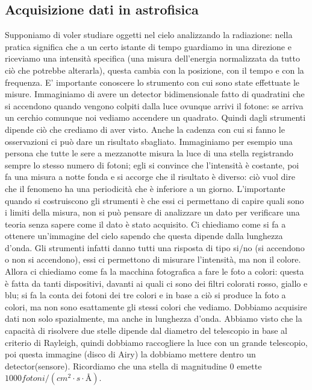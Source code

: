 \documentclass[a4paper,11pt]{article}
\begin{document}
\vspace{3mm}
\subsection{Acquisizione dati in astrofisica}
 Supponiamo di voler studiare oggetti nel cielo analizzando la radiazione: nella pratica significa che a un certo istante di tempo guardiamo in una direzione e riceviamo una intensità specifica (una misura dell’energia normalizzata da tutto ciò che potrebbe alterarla), questa cambia con la posizione, con il tempo e con la frequenza. 
\newline
E’ importante conoscere lo strumento con cui sono state effettuate le misure. Immaginiamo di avere un detector bidimensionale fatto di quadratini che si accendono quando vengono colpiti dalla luce ovunque arrivi il fotone: se arriva un cerchio comunque noi vediamo accendere un quadrato. Quindi dagli strumenti dipende ciò che crediamo di aver visto.
\newline
Anche la cadenza con cui si fanno le osservazioni ci può dare un risultato sbagliato. Immaginiamo per esempio una persona che tutte le sere a mezzanotte misura la luce di una stella registrando sempre lo stesso numero di fotoni; egli si convince che l’intensità è costante, poi fa una misura a notte fonda e si accorge che il risultato è diverso: ciò vuol dire che il fenomeno ha una periodicità che è inferiore a un giorno.
\newline
 L’importante quando si costruiscono gli strumenti è che essi ci permettano di capire quali sono i limiti della misura, non si può pensare di analizzare un dato per verificare una teoria senza sapere come il dato è stato acquisito.
\newline
Ci chiediamo come si fa a ottenere un’immagine del cielo sapendo che questa dipende dalla lunghezza d’onda. Gli strumenti infatti danno tutti una risposta di tipo si/no (si accendono o non si accendono), essi ci permettono di misurare l'intensità, ma non il colore. Allora ci chiediamo come fa la macchina fotografica a fare le foto a colori: questa è fatta da tanti dispositivi, davanti ai quali ci sono dei filtri colorati rosso, giallo e blu; si fa la conta dei fotoni dei tre colori e in base a ciò si produce la foto a colori, ma non sono esattamente gli stessi colori che vediamo. 
\newline
Dobbiamo acquisire dati non solo spazialmente, ma anche in lunghezza d’onda. Abbiamo visto che la capacità di risolvere due stelle dipende dal diametro del telescopio in base al criterio di Rayleigh, quindi dobbiamo raccogliere la luce con un grande telescopio, poi questa immagine (disco di Airy) la dobbiamo mettere dentro un detector(sensore). Ricordiamo che una stella di magnitudine $0$ emette $1000 fotoni/(cm^2 \cdot s \cdot 
\text{Å})$.
\end{document}
